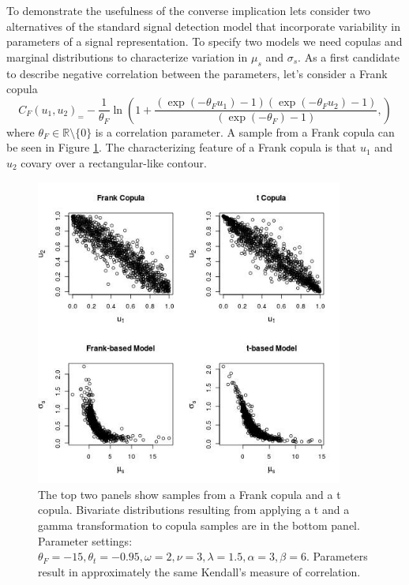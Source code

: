 \documentclass[12pt]{report}
\begin{document}
To demonstrate the usefulness of the converse implication lets consider two alternatives of the standard signal detection model that incorporate variability in parameters of a signal representation. To specify two models we need copulas and marginal distributions to characterize variation in $\mu_s$ and $\sigma_s$. As a first candidate to describe negative correlation between the parameters, let's consider a Frank copula
\begin{equation}
C_F(u_1, u_2)_ = -\frac{1}{\theta_F}\ln \left(1 + \frac{\left(\exp(-\theta_Fu_1)-1\right)\left(\exp(-\theta_Fu_2)-1\right)}{\left(\exp(-\theta_F)-1\right)},
\right)
\end{equation}
where $\theta_F \in \mathbb{R} \setminus \{0\}$ is a correlation parameter. A sample from a Frank copula can be seen in Figure \ref{fig:copmodels}. The characterizing feature of a Frank copula is that  $u_1$ and $u_2$ covary over a rectangular-like contour. 

%
\begin{figure}
\centering
\includegraphics[width=0.9\textwidth]{sdt_copulas}
\caption{The top two panels show samples from a Frank copula and a t copula. Bivariate distributions resulting from applying a t and a gamma transformation to copula samples are in the bottom panel. Parameter settings: $\theta_F = -15, \theta_t = -0.95, \omega = 2, \nu = 3, \lambda = 1.5, \alpha = 3, \beta = 6$. Parameters result in approximately the same Kendall's measure of correlation.}
\label{fig:copmodels}
\end{figure}
% 
  
\end{document}
